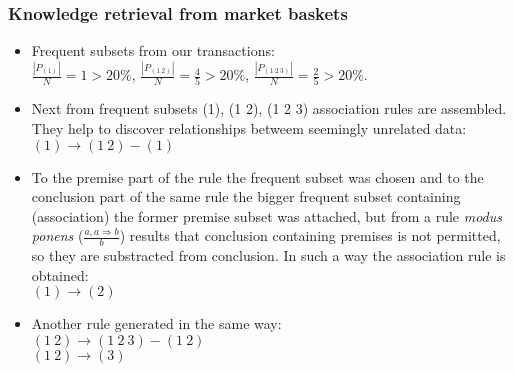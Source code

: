 \documentclass[proffesionalfonts]{beamer}
\newcommand{\arit}[1]{{\it #1 \/}}
\begin{document}
\begin{frame}
\small
\frametitle{Knowledge retrieval from market baskets}
\begin{block}{}
\begin{itemize}
\item Frequent subsets from our transactions:\\
$\displaystyle \frac{|P_{(1)}|}{N}=1 > 20\%$,
$\displaystyle \frac{|P_{(1\ 2)}|}{N}=\frac{4}{5} > 20\%$,
$\displaystyle \frac{|P_{(1\ 2\ 3)}|}{N}=\frac{2}{5} > 20\%$.
\item
Next from frequent subsets (1), (1 2), (1 2 3) association rules are assembled. They help to discover relationships betweem seemingly unrelated data:
$(1) \rightarrow (1\ 2)-(1)$
\item
To the premise part of the rule the frequent subset was chosen and to the conclusion part of the same rule the bigger frequent subset containing (association) the former premise subset was attached, but from a rule \arit{modus ponens} ($\displaystyle \frac{a,a\Rightarrow b}{b}$) results that conclusion containing premises is not permitted, so they are substracted from conclusion. In such a way the association rule is obtained: \\
$(1)\rightarrow(2)$
\item
Another rule generated in the same way:\\
$(1\ 2)\rightarrow (1\ 2\ 3) - (1\ 2)$\\
$(1\ 2)\rightarrow (3)$\\
\end{itemize}
\end{block}
\end{frame}
\end{document}
